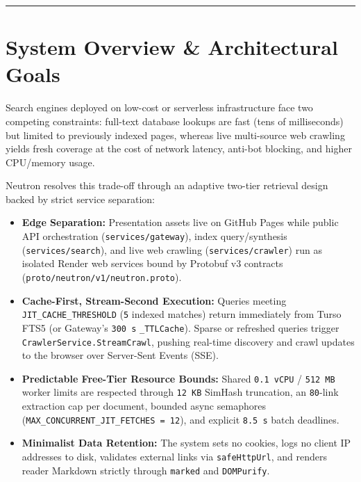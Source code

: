 \documentclass[10pt,a4paper]{article}
\begin{document}
\tableofcontents
\vspace{0.6em}
\noindent\rule{\textwidth}{0.5pt}

\section{System Overview \& Architectural Goals}

Search engines deployed on low-cost or serverless infrastructure face two competing constraints: full-text database lookups are fast (tens of milliseconds) but limited to previously indexed pages, whereas live multi-source web crawling yields fresh coverage at the cost of network latency, anti-bot blocking, and higher CPU/memory usage.

Neutron resolves this trade-off through an adaptive two-tier retrieval design backed by strict service separation:
\begin{itemize}[leftmargin=1.4em, itemsep=3pt]
    \item \textbf{Edge Separation:} Presentation assets live on GitHub Pages while public API orchestration (\texttt{services/gateway}), index query/synthesis (\texttt{services/search}), and live web crawling (\texttt{services/crawler}) run as isolated Render web services bound by Protobuf v3 contracts (\texttt{proto/neutron/v1/neutron.proto}).
    \item \textbf{Cache-First, Stream-Second Execution:} Queries meeting \texttt{JIT\_CACHE\_THRESHOLD} (\texttt{5} indexed matches) return immediately from Turso FTS5 (or Gateway's \texttt{300\,s} \texttt{\_TTLCache}). Sparse or refreshed queries trigger \texttt{CrawlerService.StreamCrawl}, pushing real-time discovery and crawl updates to the browser over Server-Sent Events (SSE).
    \item \textbf{Predictable Free-Tier Resource Bounds:} Shared \texttt{0.1\,vCPU} / \texttt{512\,MB} worker limits are respected through \texttt{12\,KB} SimHash truncation, an \texttt{80}-link extraction cap per document, bounded async semaphores (\texttt{MAX\_CONCURRENT\_JIT\_FETCHES = 12}), and explicit \texttt{8.5\,s} batch deadlines.
    \item \textbf{Minimalist Data Retention:} The system sets no cookies, logs no client IP addresses to disk, validates external links via \texttt{safeHttpUrl}, and renders reader Markdown strictly through \texttt{marked} and \texttt{DOMPurify}.
\end{itemize}
\end{document}
